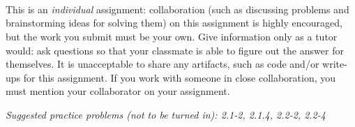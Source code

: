 \documentclass[letterpaper,11pt]{article}
\begin{document}


 \\

 \\

 \\

This is an \emph{individual} assignment: collaboration (such as discussing problems and brainstorming ideas for solving them) on this assignment is highly encouraged, but the work you submit must be your own. Give information only as a tutor would: ask questions so that your classmate is able to figure out the answer for themselves. It is unacceptable to share any artifacts, such as code and/or write-ups for this assignment. If you work with someone in close collaboration, you must mention your collaborator on your assignment.

\emph{Suggested practice problems (not to be turned in): 2.1-2, 2.1.4, 2.2-2, 2.2-4}
\end{document}
